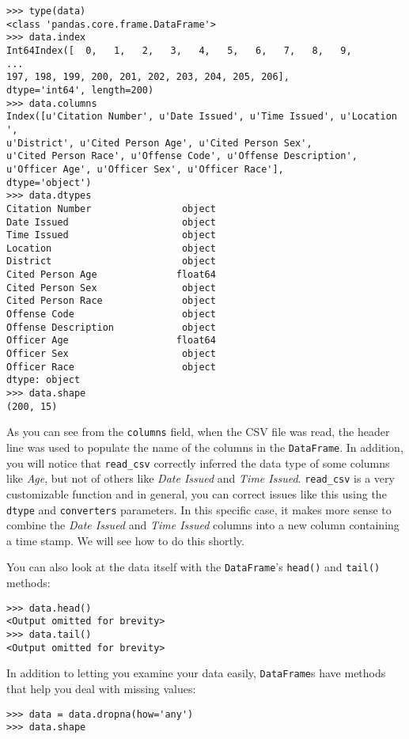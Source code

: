 \begin{lstlisting}
>>> type(data)
<class 'pandas.core.frame.DataFrame'>
>>> data.index
Int64Index([  0,   1,   2,   3,   4,   5,   6,   7,   8,   9,
...
197, 198, 199, 200, 201, 202, 203, 204, 205, 206],
dtype='int64', length=200)
>>> data.columns
Index([u'Citation Number', u'Date Issued', u'Time Issued', u'Location ',
u'District', u'Cited Person Age', u'Cited Person Sex',
u'Cited Person Race', u'Offense Code', u'Offense Description',
u'Officer Age', u'Officer Sex', u'Officer Race'],
dtype='object')
>>> data.dtypes
Citation Number                object
Date Issued                    object
Time Issued                    object
Location                       object
District                       object
Cited Person Age              float64
Cited Person Sex               object
Cited Person Race              object
Offense Code                   object
Offense Description            object
Officer Age                   float64
Officer Sex                    object
Officer Race                   object
dtype: object
>>> data.shape
(200, 15)
\end{lstlisting}

As you can see from the \texttt{columns} field, when the CSV file was
read, the header line was used to populate the name of the columns in
the \texttt{DataFrame}. In addition, you will notice that
\texttt{read\_csv} correctly inferred the data type of some columns like
\emph{Age}, but not of others like \emph{Date Issued} and \emph{Time
Issued}. \texttt{read\_csv} is a very customizable function and in
general, you can correct issues like this using the \texttt{dtype} and
\texttt{converters} parameters. In this specific case, it makes more
sense to combine the \emph{Date Issued} and \emph{Time Issued} columns
into a new column containing a time stamp. We will see how to do this
shortly.

You can also look at the data itself with the \texttt{DataFrame}'s
\texttt{head()} and \texttt{tail()} methods:

\begin{lstlisting}
>>> data.head()
<Output omitted for brevity>
>>> data.tail()
<Output omitted for brevity>
\end{lstlisting}

In addition to letting you examine your data easily, \texttt{DataFrame}s
have methods that help you deal with missing values:

\begin{lstlisting}
>>> data = data.dropna(how='any')
>>> data.shape
\end{lstlisting}

